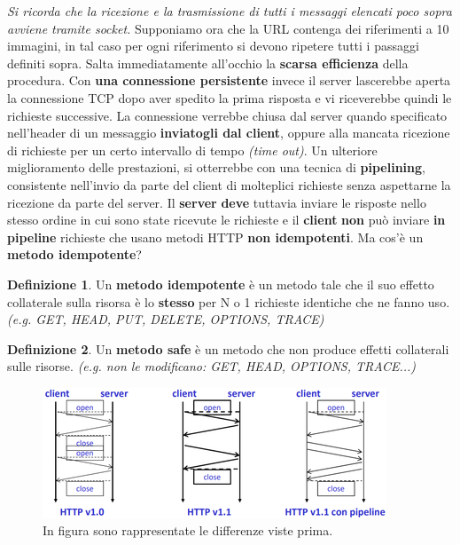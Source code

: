 \documentclass[11pt,a4paper]{article}
\theoremstyle{definition}
\newtheorem{definition}{Definizione}[section]
\begin{document}
\textit{Si ricorda che la ricezione e la trasmissione di tutti i messaggi elencati poco sopra avviene tramite socket.}\newline
Supponiamo ora che la URL contenga dei riferimenti a 10 immagini, in tal caso per ogni riferimento si devono ripetere tutti i passaggi definiti sopra. Salta immediatamente all'occhio la \textbf{scarsa efficienza} della procedura.\newline\newline
Con \textbf{una connessione persistente} invece il server lascerebbe aperta la connessione TCP dopo aver spedito la prima risposta e vi riceverebbe quindi le richieste successive. La connessione verrebbe chiusa dal server quando specificato nell’header di un messaggio  \textbf{inviatogli dal client}, oppure alla mancata ricezione di richieste per un certo intervallo di tempo \textit{(time out)}.\newline\newline
Un ulteriore miglioramento delle prestazioni, si otterrebbe con una tecnica di \textbf{pipelining}, consistente nell’invio da parte del client di molteplici richieste senza aspettarne la ricezione da parte del server.\newline
Il \textbf{server} \textbf{deve} tuttavia inviare le risposte nello stesso ordine in cui sono state ricevute le richieste e il \textbf{client} \textbf{non} può inviare \textbf{in pipeline} richieste che usano metodi HTTP \textbf{non idempotenti}. Ma cos'è un \textbf{metodo idempotente}?
\theoremstyle{definition}
\begin{definition}
	Un \textbf{metodo idempotente} è un metodo tale che il suo effetto collaterale sulla risorsa è lo \textbf{stesso} per N o 1 richieste identiche che ne fanno uso. \textit{(e.g. GET, HEAD, PUT, DELETE, OPTIONS, TRACE)}
\end{definition}
\theoremstyle{definition}
\begin{definition}
	Un \textbf{metodo safe} è un metodo che non produce effetti collaterali sulle risorse. \textit{(e.g. non le modificano: GET, HEAD, OPTIONS, TRACE...)}
\end{definition}
\begin{figure}[!h]
	\includegraphics[scale=0.85]{Immagini/Http_vs.png}
	\centering
	\caption{In figura sono rappresentate le differenze viste prima.}
\end{figure}
\end{document}
